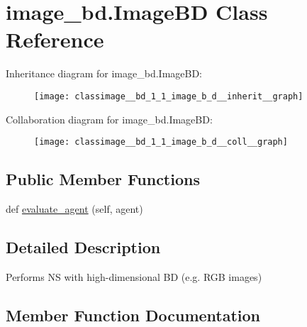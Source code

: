 \hypertarget{classimage__bd_1_1_image_b_d}{}\section{image\+\_\+bd.\+Image\+BD Class Reference}
\label{classimage__bd_1_1_image_b_d}


Inheritance diagram for image\+\_\+bd.\+Image\+BD\+:
\nopagebreak
\begin{figure}[H]
\begin{center}
\leavevmode
\texttt{[image: classimage\_\_bd\_1\_1\_image\_b\_d\_\_inherit\_\_graph]}
\end{center}
\end{figure}


Collaboration diagram for image\+\_\+bd.\+Image\+BD\+:
\nopagebreak
\begin{figure}[H]
\begin{center}
\leavevmode
\texttt{[image: classimage\_\_bd\_1\_1\_image\_b\_d\_\_coll\_\_graph]}
\end{center}
\end{figure}
\subsection*{Public Member Functions}
\begin{DoxyCompactItemize}
\item 
def \hyperlink{classimage__bd_1_1_image_b_d_ab1dac5431a43b52d52633209475e3516}{evaluate\+\_\+agent} (self, agent)
\end{DoxyCompactItemize}


\subsection{Detailed Description}
\begin{DoxyVerb}Performs NS with high-dimensional BD (e.g. RGB images)
\end{DoxyVerb}
 

\subsection{Member Function Documentation}
